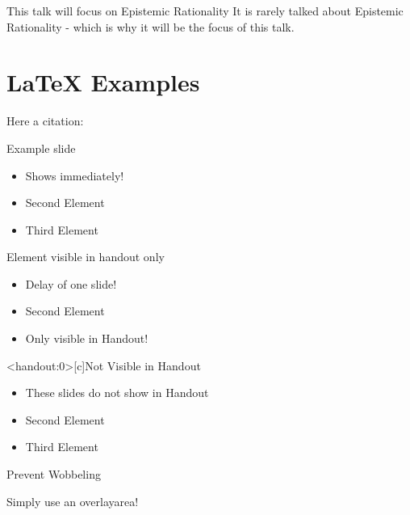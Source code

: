\begin{frame}[c]{This talk will focus on Epistemic Rationality}
    \Large
    It is rarely talked about Epistemic Rationality - which is why it will be the focus of this talk.
\end{frame}




\section{\LaTeX \phantom{ } Examples}

\begin{frame}[c]
     Here a citation: \cite{benchcpp}
\end{frame}




\begin{frame}[c]{Example slide}
    \Large
    \begin{itemize}[<+->]
        \item Shows immediately!
        \item Second Element
        \item Third Element
    \end{itemize}
\end{frame}


\begin{frame}[c]{Element visible in handout only}
    \Large
    \begin{itemize}[<+(1)->]
        \item Delay of one slide!
        \item Second Element
        \item<handout> Only visible in Handout!
    \end{itemize}
\end{frame}


\begin{frame}<handout:0>[c]{Not Visible in Handout}
    \Large
    \begin{itemize}[<+(1)->]
        \item These slides do not show in Handout
        \item Second Element
        \item Third Element
    \end{itemize}
\end{frame}


\begin{frame}[c]{Prevent Wobbeling}

    Simply use an overlayarea!


\end{frame}




